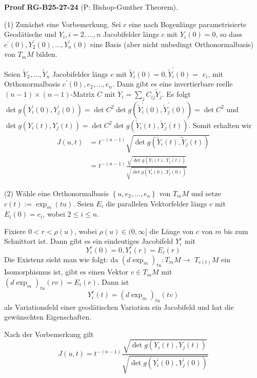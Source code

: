\documentclass[10pt, letterpaper]{article}
\newcommand{\CustomHeading}[3]{%
  \par\medskip\noindent%
  \textbf{#1 #2} \textnormal{(#3)}.\enskip%
}
\newenvironment{PROOF}[2]{\begin{unitbox}\CustomHeading{Proof}{#1}{#2}}{\end{unitbox}}
\begin{document}
\begin{PROOF}{RG-B25-27-24}{P: Bishop-Gunther Theorem}
(1) Zunächst eine Vorbemerkung. Sei $c$ eine nach Bogenlänge parametrisierte Geodätische und $Y_{i}, i=2, \ldots, n$ Jacobifelder längs $c$ mit $Y_{i}(0)=0$, so dass $c^{\prime}(0), Y_{2}^{\prime}(0), \ldots, Y_{n}^{\prime}(0)$ eine Basis (aber nicht unbedingt Orthonormalbasis) von $T_{m} M$ bilden.

Seien $\tilde{Y}_{2}, \ldots, \tilde{Y}_{n}$ Jacobifelder längs $c$ mit $\tilde{Y}_{i}(0)=0, \tilde{Y}_{i}^{\prime}(0)=$ $e_{i}$, mit Orthonormalbasis $c^{\prime}(0), e_{2}, \ldots, e_{n}$. Dann gibt es eine invertierbare reelle $(n-1) \times(n-1)$-Matrix $C$ mit $Y_{i}=\sum_{j} C_{i j} \tilde{Y}_{j}$. Es folgt $\operatorname{det} g\left(Y_{i}^{\prime}(0), Y_{j}^{\prime}(0)\right)=\operatorname{det} C^{2} \operatorname{det} g\left(\tilde{Y}_{i}^{\prime}(0), \tilde{Y}_{j}^{\prime}(0)\right)=\operatorname{det} C^{2}$ und $\operatorname{det} g\left(Y_{i}(t), Y_{j}(t)\right)=\operatorname{det} C^{2} \operatorname{det} g\left(\tilde{Y}_{i}(t), \tilde{Y}_{j}(t)\right)$.
Somit erhalten wir
$$
\begin{aligned}
J(u, t) & =t^{-(n-1)} \sqrt{\operatorname{det} g\left(\tilde{Y}_{i}(t), \tilde{Y}_{j}(t)\right)} \\
& =t^{-(n-1)} \frac{\sqrt{\operatorname{det} g\left(Y_{i}(t), Y_{j}(t)\right)}}{\sqrt{\operatorname{det} g\left(Y_{i}^{\prime}(0), Y_{j}^{\prime}(0)\right)}}
\end{aligned}
$$

(2) Wähle eine Orthonormalbasis $\left\{u, e_{2}, \ldots, e_{n}\right\}$ von $T_{m} M$ und setze $c(t):=\exp _{m}(t u)$. Seien $E_{i}$ die parallelen Vektorfelder längs $c$ mit $E_{i}(0)=e_{i}$, wobei $2 \leq i \leq n$.

Fixiere $0<r<\rho(u)$, wobei $\rho(u) \in(0, \infty]$ die Länge von $c$ von $m$ bis zum Schnittort ist. Dann gibt es ein eindeutiges Jacobifeld $Y_{i}^{r}$ mit
$$
Y_{i}^{r}(0)=0, Y_{i}^{r}(r)=E_{i}(r)
$$
Die Existenz sieht man wie folgt: da $\left(d \exp _{m}\right)_{t u}: T_{m} M \rightarrow$ $T_{c(t)} M$ ein Isomorphismus ist, gibt es einen Vektor $v \in T_{m} M$ mit $\left(d \exp _{m}\right)_{t u}(r v)=E_{i}(r)$. Dann ist
$$
Y_{i}^{r}(t)=\left(d \exp _{m}\right)_{t u}(t v)
$$
als Variationsfeld einer geodätischen Variation ein Jacobifeld und hat die gewünschten Eigenschaften.

Nach der Vorbemerkung gilt
$$
J(u, t)=t^{-(n-1)} \frac{\sqrt{\operatorname{det} g\left(Y_{i}(t), Y_{j}(t)\right)}}{\sqrt{\operatorname{det} g\left(Y_{i}^{\prime}(0), Y_{j}^{\prime}(0)\right)}}
$$


\end{PROOF}
\end{document}
